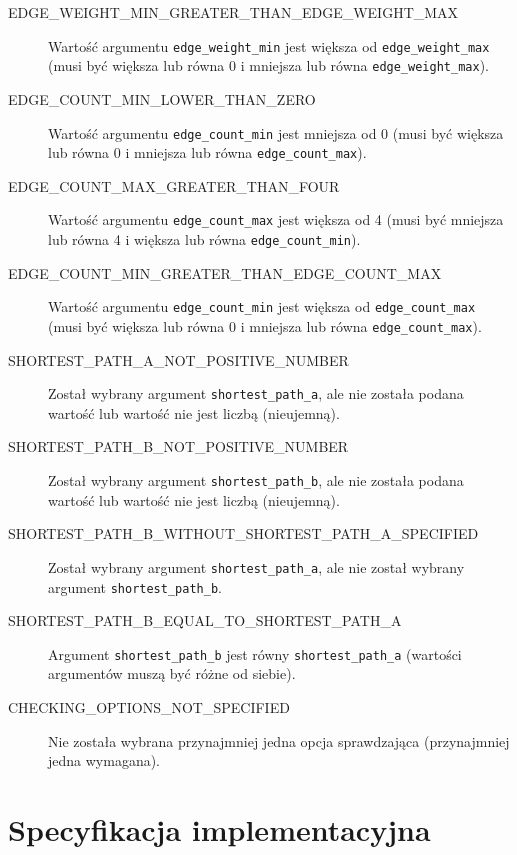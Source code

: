 \documentclass[11pt,a4paper]{report}
\begin{document}
\begin{description}
        \item[EDGE\_WEIGHT\_MIN\_GREATER\_THAN\_EDGE\_WEIGHT\_MAX] Wartość argumentu \verb|edge_weight_min| jest większa od \verb|edge_weight_max| (musi być większa lub równa 0 i mniejsza lub równa \verb|edge_weight_max|).
        \item[EDGE\_COUNT\_MIN\_LOWER\_THAN\_ZERO] Wartość argumentu \verb|edge_count_min| jest mniejsza od 0 (musi być większa lub równa 0 i mniejsza lub równa \verb|edge_count_max|).
        \item[EDGE\_COUNT\_MAX\_GREATER\_THAN\_FOUR] Wartość argumentu \verb|edge_count_max| jest większa od 4 (musi być mniejsza lub równa 4 i większa lub równa \verb|edge_count_min|).
        \item[EDGE\_COUNT\_MIN\_GREATER\_THAN\_EDGE\_COUNT\_MAX] Wartość argumentu \verb|edge_count_min| jest większa od \verb|edge_count_max| (musi być większa lub równa 0 i mniejsza lub równa \verb|edge_count_max|).
        \item[SHORTEST\_PATH\_A\_NOT\_POSITIVE\_NUMBER] Został wybrany argument \verb|shortest_path_a|, ale nie została podana wartość lub wartość nie jest liczbą (nieujemną).
        \item[SHORTEST\_PATH\_B\_NOT\_POSITIVE\_NUMBER] Został wybrany argument \verb|shortest_path_b|, ale nie została podana wartość lub wartość nie jest liczbą (nieujemną).
        \item[SHORTEST\_PATH\_B\_WITHOUT\_SHORTEST\_PATH\_A\_SPECIFIED] Został wybrany argument \verb|shortest_path_a|, ale nie został wybrany argument \verb|shortest_path_b|.
        \item[SHORTEST\_PATH\_B\_EQUAL\_TO\_SHORTEST\_PATH\_A] Argument \verb|shortest_path_b| jest równy \verb|shortest_path_a| (wartości argumentów muszą być różne od siebie).
        \item[CHECKING\_OPTIONS\_NOT\_SPECIFIED] Nie została wybrana przynajmniej jedna opcja sprawdzająca (przynajmniej jedna wymagana).
    \end{description}


    \chapter{Specyfikacja implementacyjna}    
\end{document}
